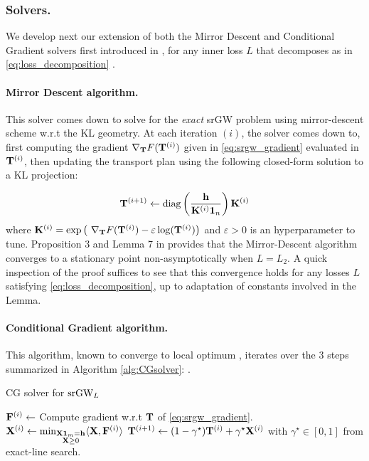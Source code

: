 \subsubsection{Solvers.}
We develop next our extension of both the Mirror Descent and Conditional Gradient solvers first introduced in \citep{vincent2021semi}, for any inner loss $L$ that decomposes as in \eqref{eq:loss_decomposition} .

\paragraph{Mirror Descent algorithm.} This solver comes down to solve for the \emph{exact} srGW problem using mirror-descent scheme w.r.t the KL geometry. At each iteration $(i)$, the solver comes down to, first computing the gradient $\nabla_{{\mathbf{T}}}F({\mathbf{T}}^{(i)})$ given in \eqref{eq:srgw_gradient} evaluated in ${\mathbf{T}}^{(i)}$, then updating the transport plan using the following closed-form solution to a KL projection:

\begin{equation}
{\mathbf{T}}^{(i+1)} \leftarrow \operatorname{diag}\left( \frac{{\mathbf{h}}}{{\mathbf{K}}^{(i)}\bm{1}_n} \right) {\mathbf{K}}^{(i)}
\end{equation}
where ${\mathbf{K}}^{(i)} = \exp \left(\ \nabla_{{\mathbf{T}}}F({\mathbf{T}}^{(i)}) - \varepsilon \log({\mathbf{T}}^{(i)})  \right)$ and $\varepsilon > 0$ is an hyperparameter to tune. Proposition 3 and Lemma 7 in \cite[Chapter 6]{vincent2023optimal} provides that the Mirror-Descent algorithm converges to a stationary point non-asymptotically when $L=L_2$. A quick inspection of the proof suffices to see that this convergence holds for any losses $L$ satisfying \eqref{eq:loss_decomposition}, up to adaptation of constants involved in the Lemma.

\paragraph{Conditional Gradient algorithm.} This algorithm, known to converge to local optimum \citep{lacoste2016convergence}, iterates over the 3 steps summarized in Algorithm \ref{alg:CGsolver}:
.\begin{algorithm}[H]
\caption{CG solver for $\operatorname{srGW}_L$\label{alg:CGsolver}}
\begin{algorithmic}[1]
	\REPEAT
	\STATE ${\mathbf{F}}^{(i)}\leftarrow $  Compute gradient  w.r.t ${\mathbf{T}}$ of \eqref{eq:srgw_gradient}.
	\STATE ${\mathbf{X}}^{(i)}\leftarrow \min_{\substack{{\mathbf{X}}\bm{1}_m ={\mathbf{h}}\\ {\mathbf{X}} \geq 0}} \langle {\mathbf{X}} , {\mathbf{F}}^{(i)} \rangle $%
	\STATE ${\mathbf{T}}^{(i+1)} \leftarrow (1-\gamma^\star){\mathbf{T}}^{(i)} + \gamma^\star {\mathbf{X}}^{(i)}$   with $\gamma^\star \in [0,1]$ from exact-line search.
\end{algorithmic}
\end{algorithm}

